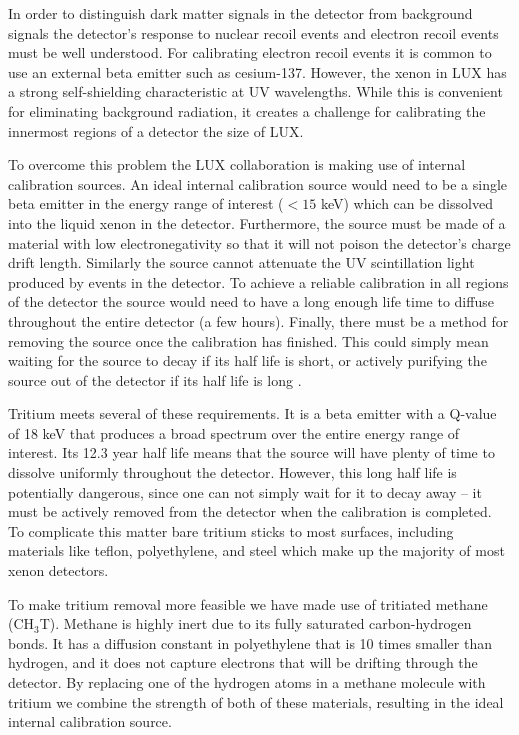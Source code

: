 In order to distinguish dark matter signals in the detector from background signals the detector's response to nuclear recoil events and electron recoil events must be well understood. For calibrating electron recoil events it is common to use an external beta emitter such as cesium-137.  However, the xenon in LUX has a strong self-shielding characteristic at UV wavelengths.  While this is convenient for eliminating background radiation, it creates a challenge for calibrating the innermost regions of a detector the size of LUX.

To overcome this problem the LUX collaboration is making use of internal calibration sources.  An ideal internal calibration source would need to be a single beta emitter in the energy range of interest ($ <15 $ keV) which can be dissolved into the liquid xenon in the detector.  Furthermore, the source must be made of a material with low electronegativity so that it will not poison the detector's charge drift length.  Similarly the source cannot attenuate the UV scintillation light produced by events in the detector.  To achieve a reliable calibration in all regions of the detector the source would need to have a long enough life time to diffuse throughout the entire detector (a few hours).  Finally, there must be a method for removing the source once the calibration has finished.  This could simply mean waiting for the source to decay if its half life is short, or actively purifying the source out of the detector if its half life is long \cite{Kastens}.

Tritium meets several of these requirements.  It is a beta emitter with a Q-value of 18 keV that produces a broad spectrum over the entire energy range of interest.  Its 12.3 year half life means that the source will have plenty of time to dissolve uniformly throughout the detector.  However, this long half life is potentially dangerous, since one can not simply wait for it to decay away -- it must be actively removed from the detector when the calibration is completed.  To complicate this matter bare tritium sticks to most surfaces, including materials like teflon, polyethylene, and steel which make up the majority of most xenon detectors.

To make tritium removal more feasible we have made use of tritiated methane (CH$_3$T).  Methane is highly inert due to its fully saturated carbon-hydrogen bonds.  It has a diffusion constant in polyethylene that is 10 times smaller than hydrogen, and it does not capture electrons that will be drifting through the detector.  By replacing one of the hydrogen atoms in a methane molecule with tritium we combine the strength of both of these materials, resulting in the ideal internal calibration source.

